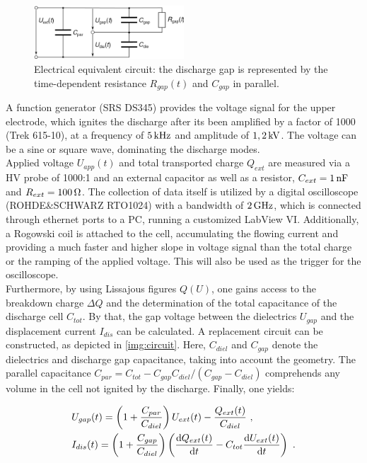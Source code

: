 \documentclass[a4paper,10pt,twoside]{article}
\newcommand{\diff}{\textnormal{d}}
\begin{document}
				\begin{figure}
					\centering
					\includegraphics[width=0.5\textwidth]{figures/setup/replacementcircuit}
					\caption{Electrical equivalent circuit: the discharge gap is represented by the time-dependent resistance $R_{gap}(t)$ and $C_{gap}$ in parallel.}
					\label{img:circuit}
				\end{figure}
		
					 
			 A function generator (SRS DS345) provides the voltage signal for the upper electrode, which ignites the discharge after its been amplified by a factor of 1000 (Trek 615-10), at a frequency of $\unit[5]{kHz}$ and amplitude of $\unit[1,2]{kV}$. The voltage can be a sine or square wave, dominating the discharge modes.\\
			 Applied voltage $U_{app}(t)$ and total transported charge $Q_{ext}$ are measured via a HV probe of 1000:1 and an external capacitor as well as a resistor, $C_{ext}=\unit[1]{nF}$ and $R_{ext}=\unit[100]{\Omega}$. The collection of data itself is utilized by a digital oscilloscope (ROHDE\&SCHWARZ RTO1024) with a bandwidth of $\unit[2]{GHz}$, which is connected through ethernet ports to a PC, running a customized LabView VI. Additionally, a Rogowski coil is attached to the cell, accumulating the flowing current and providing a much faster and higher slope in voltage signal than the total charge or the ramping of the applied voltage. This will also be used as the trigger for the oscilloscope.\\
			 Furthermore, by using Lissajous figures $Q(U)$, one gains access to the breakdown charge $\Delta Q$ and the determination of the total capacitance of the discharge cell $C_{tot}$. By that, the gap voltage between the dielectrics $U_{gap}$ and the displacement current $I_{dis}$ can be calculated. A replacement circuit can be constructed, as depicted in \autoref{img:circuit}. Here, $C_{diel}$ and $C_{gap}$ denote the dielectrics and discharge gap capacitance, taking into account the geometry. The parallel capacitance $C_{par}=C_{tot}-C_{gap}C_{diel}/\left(C_{gap}-C_{diel}\right)$ comprehends any volume in the cell not ignited by the discharge. Finally, one yields:
			 
				\begin{align*}
					 &U_{gap}(t)=\left(1+\frac{C_{par}}{C_{diel}}\right)U_{ext}(t)-\frac{Q_{ext}(t)}{C_{diel}} \,\, , \\
					 &I_{dis}(t)=\left(1+\frac{C_{gap}}{C_{diel}}\right)\left(\frac{\diff Q_{ext}(t)}{\diff t}-C_{tot}\frac{\diff U_{ext}(t)}{\diff t}\right) \,\, .
				\end{align*}	
\end{document}
